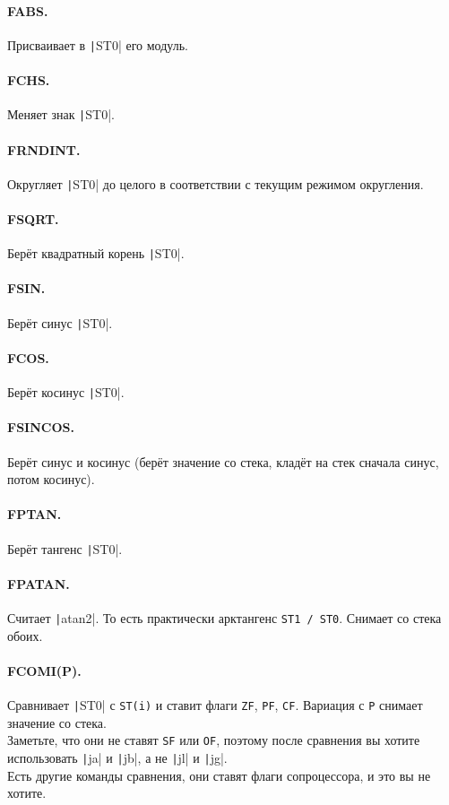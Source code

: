 \documentclass{article}
\begin{document}
    \paragraph{FABS.}
    Присваивает в \texttt|ST0| его модуль.
    \paragraph{FCHS.}
    Меняет знак \texttt|ST0|.
    \paragraph{FRNDINT.}
    Округляет \texttt|ST0| до целого в соответствии с текущим режимом округления.
    \paragraph{FSQRT.}
    Берёт квадратный корень \texttt|ST0|.
    \paragraph{FSIN.}
    Берёт синус \texttt|ST0|.
    \paragraph{FCOS.}
    Берёт косинус \texttt|ST0|.
    \paragraph{FSINCOS.}
    Берёт синус и косинус (берёт значение со стека, кладёт на стек сначала синус, потом косинус).
    \paragraph{FPTAN.}
    Берёт тангенс \texttt|ST0|.
    \paragraph{FPATAN.}
    Считает \texttt|atan2|. То есть практически арктангенс \Verb|ST1 / ST0|. Снимает со стека обоих.
    \paragraph{FCOMI(P).}
    Сравнивает \texttt|ST0| с \Verb|ST(i)| и ставит флаги \Verb|ZF|, \Verb|PF|, \Verb|CF|. Вариация с \Verb|P| снимает значение со стека.\\
    Заметьте, что они не ставят \Verb|SF| или \Verb|OF|, поэтому после сравнения вы хотите использовать \texttt|ja| и \texttt|jb|, а не \texttt|jl| и \texttt|jg|.\\
    Есть другие команды сравнения, они ставят флаги сопроцессора, и это вы не хотите.
\end{document}
